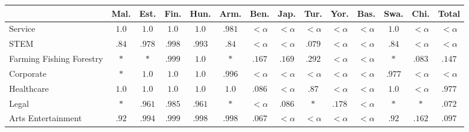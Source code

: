 \documentclass[twoside,11pt]{article}
\begin{document}
\begin{table}[H]
\centering
\footnotesize\setlength{\tabcolsep}{2.5pt}
\small
\begin{tabular}{|m{1.75cm}|cccccccccccc|c|}
\hline
& Mal. & Est. & Fin. & Hun. & Arm. & Ben. & Jap. & Tur. & Yor. & Bas. & Swa. & Chi. & Total \\ \hline
Service	&	\cellcolor{blue!45}$1.0$	&	\cellcolor{blue!45}$1.0$	&	\cellcolor{blue!45}$1.0$	&	\cellcolor{blue!45}$1.0$	&	\cellcolor{blue!45}$.981$	&	$<\alpha$	&	$<\alpha$	&	$<\alpha$	&	$<\alpha$	&	$<\alpha$	&	\cellcolor{blue!45}$1.0$	&	$<\alpha$	&	$<\alpha$	 \\ \hline 
STEM	&	\cellcolor{blue!25}$.84$	&	\cellcolor{blue!45}$.978$	&	\cellcolor{blue!45}$.998$	&	\cellcolor{blue!45}$.993$	&	\cellcolor{blue!25}$.84$	&	$<\alpha$	&	$<\alpha$	&	\cellcolor{blue!25}$.079$	&	$<\alpha$	&	$<\alpha$	&	\cellcolor{blue!25}$.84$	&	$<\alpha$	&	$<\alpha$	 \\ \hline 
Farming 
 Fishing 
 Forestry	&	\cellcolor{blue!25}$*$	&	\cellcolor{blue!25}$*$	&	\cellcolor{blue!45}$.999$	&	\cellcolor{blue!45}$1.0$	&	\cellcolor{blue!25}$*$	&	\cellcolor{blue!25}$.167$	&	\cellcolor{blue!25}$.169$	&	\cellcolor{blue!25}$.292$	&	$<\alpha$	&	$<\alpha$	&	\cellcolor{blue!25}$*$	&	\cellcolor{blue!25}$.083$	&	\cellcolor{blue!25}$.147$	 \\ \hline 
Corporate	&	\cellcolor{blue!25}$*$	&	\cellcolor{blue!45}$1.0$	&	\cellcolor{blue!45}$1.0$	&	\cellcolor{blue!45}$1.0$	&	\cellcolor{blue!45}$.996$	&	$<\alpha$	&	$<\alpha$	&	$<\alpha$	&	$<\alpha$	&	$<\alpha$	&	\cellcolor{blue!45}$.977$	&	$<\alpha$	&	$<\alpha$	 \\ \hline 
Healthcare	&	\cellcolor{blue!45}$1.0$	&	\cellcolor{blue!45}$1.0$	&	\cellcolor{blue!45}$1.0$	&	\cellcolor{blue!45}$1.0$	&	\cellcolor{blue!45}$1.0$	&	\cellcolor{blue!25}$.086$	&	$<\alpha$	&	\cellcolor{blue!25}$.87$	&	$<\alpha$	&	$<\alpha$	&	\cellcolor{blue!45}$1.0$	&	$<\alpha$	&	\cellcolor{blue!45}$.977$	 \\ \hline 
Legal	&	\cellcolor{blue!25}$*$	&	\cellcolor{blue!45}$.961$	&	\cellcolor{blue!45}$.985$	&	\cellcolor{blue!45}$.961$	&	\cellcolor{blue!25}$*$	&	$<\alpha$	&	\cellcolor{blue!25}$.086$	&	\cellcolor{blue!25}$*$	&	\cellcolor{blue!25}$.178$	&	$<\alpha$	&	\cellcolor{blue!25}$*$	&	\cellcolor{blue!25}$*$	&	\cellcolor{blue!25}$.072$	 \\ \hline 
Arts 
 Entertainment	&	\cellcolor{blue!25}$.92$	&	\cellcolor{blue!45}$.994$	&	\cellcolor{blue!45}$.999$	&	\cellcolor{blue!45}$.998$	&	\cellcolor{blue!45}$.998$	&	\cellcolor{blue!25}$.067$	&	$<\alpha$	&	$<\alpha$	&	$<\alpha$	&	$<\alpha$	&	\cellcolor{blue!25}$.92$	&	\cellcolor{blue!25}$.162$	&	\cellcolor{blue!25}$.097$	 \\ \hline 

\end{tabular}
\end{table}
\end{document}
